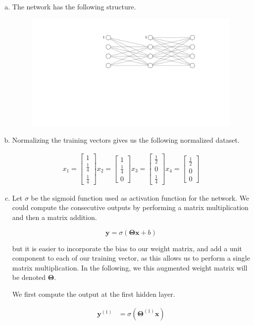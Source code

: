 \documentclass[a4paper, 10pt, twoside]{article}
\begin{document}
\begin{enumerate}[a)]
	\item The network has the following structure.
	\begin{figure}[h]
        \includegraphics[width=0.8 \textwidth]{nn.png}
    \end{figure}

    \item Normalizing the training vectors gives us the following normalized dataset.
    
    \begin{align*}
        x_1 = \begin{bmatrix}1 \\ \frac{1}{4} \\ \frac{1}{4}\end{bmatrix}
        x_2 = \begin{bmatrix}1 \\ \frac{1}{4} \\ 0\end{bmatrix}
        x_3 = \begin{bmatrix}\frac{1}{2} \\ 0 \\ \frac{1}{4}\end{bmatrix}
        x_4 = \begin{bmatrix}\frac{1}{2} \\ 0 \\ 0\end{bmatrix}
    \end{align*}

    \item 
    Let $\sigma$ be the sigmoid function used as activation function for the network. We could compute the consecutive outputs by performing a matrix multiplication and then a matrix addition.

    \[
        \bm{y} = \sigma(\bm{\Theta}\bm{x} + b)
    \]

    but it is easier to incorporate the bias to our weight matrix, and add a unit component to each of our training vector, as this allows us to perform a single matrix multiplication. In the following, we this augmented weight matrix will be denoted $\bm{\Theta}$.

    We first compute the output at the first hidden layer.
    
    \begin{align*}
        \bm{y}^{(1)} &= \sigma(\bm{\Theta}^{(1)}\bm{x}) \\
    \end{align*}

\end{enumerate}
\end{document}
